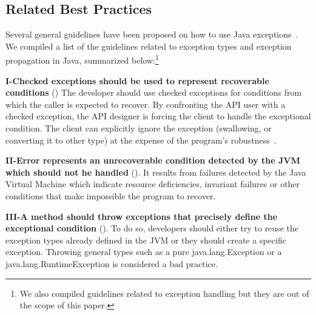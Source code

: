 \documentclass[conference]{IEEEtran}
\begin{document}
\subsection{Related Best Practices}
\label{sec:best}

Several general guidelines have been proposed on how to use Java
exceptions~\cite{mandrioli1992advances,gosling2000java,wirfs2006toward,
bloch2008effective}. 
We compiled a list of the guidelines related to exception types and exception propagation in Java, summarized below:\footnote{We also compiled guidelines related
to exception handling but they are out of the scope of this paper.}


\textbf{I-Checked exceptions should be used to represent recoverable
conditions} (\cite{mandrioli1992advances,gosling2000java,wirfs2006toward,bloch2008effective})
The developer should use checked exceptions for conditions from which the caller
is expected to recover. By confronting the API user with a checked exception,
the API designer is forcing the client to handle the exceptional condition. The
client can explicitly ignore the exception (swallowing, or converting it to
other type) at the expense of the program's robustness~\cite{gosling2000java}.

\textbf{II-Error represents an unrecoverable condition detected by the JVM which
should not he handled} (\cite{gosling2000java}). It results from failures detected
by the Java Virtual Machine which indicate resource deficiencies, invariant
failures or other conditions that make impossible the program to recover.


\textbf{III-A method should throw exceptions that precisely define the
exceptional condition} (\cite{gosling2000java,bloch2008effective}). To do so,
developers should either try to reuse the exception types already defined in the
JVM or they should create a specific exception. Throwing general types such as a
pure java.lang.Exception or a java.lang.RuntimeException is considered a bad practice.

\end{document}
